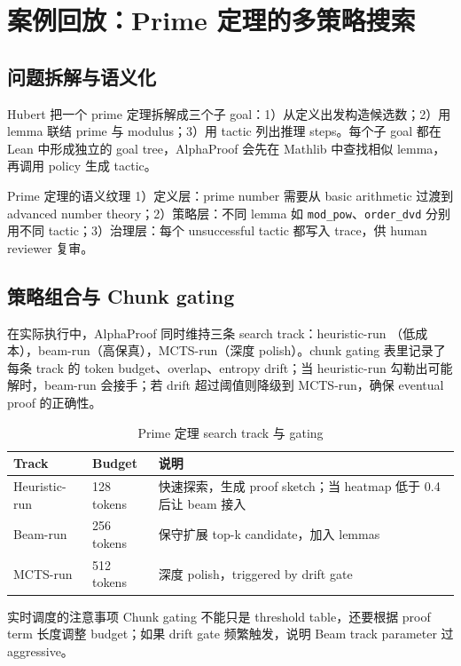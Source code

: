 \documentclass[a4paper]{article}
\begin{document}
\section{案例回放：Prime 定理的多策略搜索}

\subsection{问题拆解与语义化}
Hubert 把一个 prime 定理拆解成三个子 goal：1）从定义出发构造候选数；2）用 lemma 联结 prime 与 modulus；3）用 tactic 列出推理 steps。每个子 goal 都在 Lean 中形成独立的 goal tree，AlphaProof 会先在 Mathlib 中查找相似 lemma，再调用 policy 生成 tactic。

\begin{knowledgebox}{Prime 定理的语义纹理}
1）定义层：prime number 需要从 basic arithmetic 过渡到 advanced number theory；2）策略层：不同 lemma 如 \texttt{mod\_pow}、\texttt{order\_dvd} 分别用不同 tactic；3）治理层：每个 unsuccessful tactic 都写入 trace，供 human reviewer 复审。
\end{knowledgebox}

\subsection{策略组合与 Chunk gating}
在实际执行中，AlphaProof 同时维持三条 search track：heuristic-run （低成本），beam-run（高保真），MCTS-run（深度 polish）。chunk gating 表里记录了每条 track 的 token budget、overlap、entropy drift；当 heuristic-run 勾勒出可能解时，beam-run 会接手；若 drift 超过阈值则降级到 MCTS-run，确保 eventual proof 的正确性。

\begin{table}[H]
\centering
\begin{tabular}{p{3.5cm}p{3.5cm}p{5cm}}
\toprule
Track & Budget & 说明 \\
\midrule
Heuristic-run & 128 tokens & 快速探索，生成 proof sketch；当 heatmap 低于 0.4 后让 beam 接入 \\
Beam-run & 256 tokens & 保守扩展 top-k candidate，加入 lemmas \\
MCTS-run & 512 tokens & 深度 polish，triggered by drift gate \\
\bottomrule
\end{tabular}
\caption{Prime 定理 search track 与 gating}
\end{table}

\begin{warningbox}{实时调度的注意事项}
Chunk gating 不能只是 threshold table，还要根据 proof term 长度调整 budget；如果 drift gate 频繁触发，说明 Beam track parameter 过 aggressive。
\end{warningbox}
\end{document}
